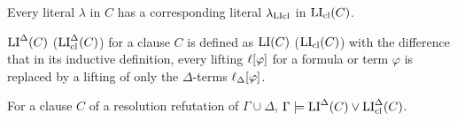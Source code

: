 \documentclass[,%
	draft=false,%
	numbers=noendperiod
	11pt,
	a4paper,
	oneside,%
	openany,
]{memoir}
\begin{document}
\begin{prop}
	\label{prop:corresponding_literal}
	Every literal $\lambda$ in $C$ has a corresponding literal $\lambda_{\operatorname{LIcl}}$ in\nolinebreak{} $\operatorname{LI}_{\operatorname{cl}}(C)$.
\end{prop}


\begin{defi}
	$\operatorname{LI}^\Delta(C)$ ($\operatorname{LI}_{\operatorname{cl}}^\Delta(C)$) for a clause $C$ is defined as $\operatorname{LI}(C)$ ($\operatorname{LI}_{\operatorname{cl}}(C)$) with the difference that in its inductive definition, every lifting $\ell[\varphi]$ for a formula or term $\varphi$ is replaced by a lifting of only the $\Delta$-terms $\ell_{\Delta}[\varphi]$.
\end{defi}


\begin{lemma}
	\label{lemma:gamma_proves_pide}
	For a clause $C$ of a resolution refutation of $\Gamma\cup\Delta$, 
	$\Gamma\models \operatorname{LI}^\Delta(C) \lor \operatorname{LI}_{\operatorname{cl}}^\Delta(C)$.
\end{lemma}
\end{document}
